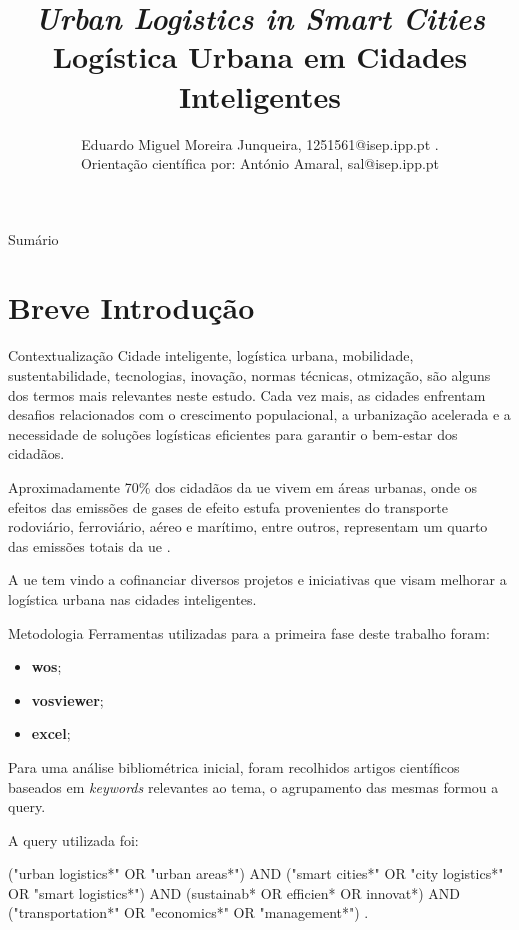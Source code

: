 \documentclass[
aspectratio=169,	%
MEEC,				%
portuguese,			%
]{DEEclassP}
\title{\textit{Urban Logistics in Smart Cities}\\Logística Urbana em Cidades Inteligentes}	%
\author[Eduardo Junqueira]{Eduardo Miguel Moreira Junqueira, 1251561@isep.ipp.pt \cite{JunqueiraDevEduardoRepositório}.
\\Orientação científica por: António Amaral, sal@isep.ipp.pt}
\begin{document}
\begin{frame}
	\titlepage %
\end{frame}
\begin{frame}{Sumário}%
	\tableofcontents
	\printglossary[type=\acronymtype]
\end{frame}


\section{Breve Introdução}%
\begin{frame}{Contextualização}
Cidade inteligente, logística urbana, mobilidade, sustentabilidade, tecnologias, inovação, normas técnicas, otmização, são alguns dos termos mais relevantes neste estudo.
Cada vez mais, as cidades enfrentam desafios relacionados com o crescimento populacional, a urbanização acelerada e a necessidade de soluções logísticas eficientes para garantir o bem-estar dos cidadãos.

Aproximadamente 70\% dos cidadãos da \gls{ue} vivem em áreas urbanas, onde os efeitos das emissões de gases de efeito estufa provenientes do transporte rodoviário, ferroviário, aéreo e marítimo,  entre outros, representam um quarto das emissões totais da \gls{ue} \cite{CIVITAS_2025}.

A \gls{ue} tem vindo a cofinanciar diversos projetos e iniciativas que visam melhorar a logística urbana nas cidades inteligentes.

\end{frame}

\begin{frame}{Metodologia}
Ferramentas utilizadas para a primeira fase deste trabalho foram:
\begin{itemize}
	\item \textbf{\gls{wos}};
	\item \textbf{\gls{vosviewer}};
	\item \textbf{\gls{excel}};
\end{itemize}
Para uma análise bibliométrica inicial, foram recolhidos artigos científicos baseados em \textit{keywords} relevantes ao tema, o agrupamento das mesmas formou a \gls{query}.

A \gls{query} utilizada foi:

 ("urban logistics*" OR "urban areas*") AND ("smart cities*" OR "city logistics*" OR "smart logistics*") AND (sustainab* OR efficien* OR innovat*) AND ("transportation*" OR "economics*" OR "management*") \cite{JunqueiraDevEduardoRepositório}.
\end{frame}
\end{document}

